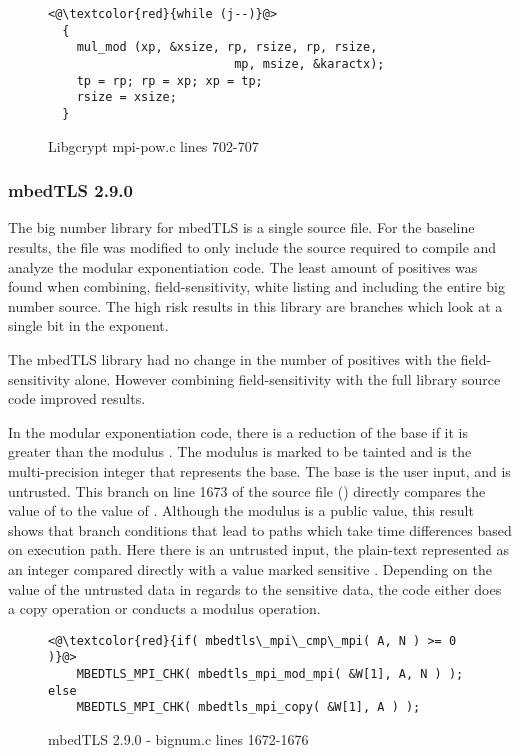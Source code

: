 \begin{figure}[htpb]
\begin{lstlisting}
<@\textcolor{red}{while (j--)}@>
  {
    mul_mod (xp, &xsize, rp, rsize, rp, rsize,
                          mp, msize, &karactx);
    tp = rp; rp = xp; xp = tp;
    rsize = xsize;
  }
\end{lstlisting}
\caption{Libgcrypt mpi-pow.c lines 702-707}
\label{code:libgcrypt_whilej}
\end{figure}


\subsubsection{mbedTLS 2.9.0}

     The big number library for mbedTLS is a single source file. For the
     baseline results, the file was modified to only include the source required
     to compile and analyze the modular exponentiation code. The least amount of
     positives was found when combining, field-sensitivity, white listing and
     including the entire big number source. The high risk results in this
     library are branches which look at a single bit in the exponent.

The mbedTLS library had no change in the number of positives with the
field-sensitivity alone. However combining field-sensitivity with the full
library source code improved results.

In the modular exponentiation code, there is a reduction of the base 
if it is greater than the modulus . The modulus  is marked to be tainted
and  is the multi-precision integer that represents the base. The base is the
user input, and is untrusted. This branch on line 1673 of the source file ()
directly compares the value of  to the value of . Although
the modulus is a public value, this result shows that branch conditions that
lead to paths which take time differences based on execution path. Here there is
an untrusted input, the plain-text represented as an integer 
compared directly with a value marked sensitive . Depending on the
value of the untrusted data in regards to the sensitive data, the code either
does a copy operation or conducts a modulus operation.

\begin{figure}[h!]
\begin{lstlisting}
<@\textcolor{red}{if( mbedtls\_mpi\_cmp\_mpi( A, N ) >= 0 )}@>
    MBEDTLS_MPI_CHK( mbedtls_mpi_mod_mpi( &W[1], A, N ) );
else
    MBEDTLS_MPI_CHK( mbedtls_mpi_copy( &W[1], A ) );
\end{lstlisting}

\caption{mbedTLS 2.9.0 - bignum.c lines 1672-1676}
\end{figure}

